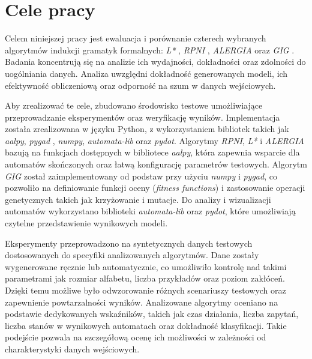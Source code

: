 
\section{Cele pracy}
\label{sec:celePracy}


Celem niniejszej pracy jest ewaluacja i porównanie czterech wybranych algorytmów indukcji gramatyk formalnych: \textit{L*} \cite{L_STAR}, \textit{RPNI} \cite{RPNI}, \textit{ALERGIA} \cite{ALERGIA} oraz \textit{GIG} \cite{GIG}. Badania koncentrują się na analizie ich wydajności, dokładności oraz zdolności do uogólniania danych. Analiza uwzględni dokładność generowanych modeli, ich efektywność obliczeniową oraz odporność na szum w danych wejściowych.

Aby zrealizować te cele, zbudowano środowisko testowe umożliwiające przeprowadzanie eksperymentów oraz weryfikację wyników. Implementacja została zrealizowana w języku Python, z wykorzystaniem bibliotek takich jak \textit{aalpy}, \textit{pygad} \cite{Gad2024}, \textit{numpy}, \textit{automata-lib} oraz \textit{pydot}. Algorytmy \textit{RPNI}, \textit{L*} i \textit{ALERGIA} bazują na funkcjach dostępnych w bibliotece \textit{aalpy}, która zapewnia wsparcie dla automatów skończonych oraz łatwą konfigurację parametrów testowych. Algorytm \textit{GIG} został zaimplementowany od podstaw przy użyciu \textit{numpy} i \textit{pygad}, co pozwoliło na definiowanie funkcji oceny (\textit{fitness functions}) i zastosowanie operacji genetycznych takich jak krzyżowanie i mutacje. Do analizy i wizualizacji automatów wykorzystano biblioteki \textit{automata-lib} oraz \textit{pydot}, które umożliwiają czytelne przedstawienie wynikowych modeli.

Eksperymenty przeprowadzono na syntetycznych danych testowych dostosowanych do specyfiki analizowanych algorytmów. Dane zostały wygenerowane ręcznie lub automatycznie, co umożliwiło kontrolę nad takimi parametrami jak rozmiar alfabetu, liczba przykładów oraz poziom zakłóceń. Dzięki temu możliwe było odwzorowanie różnych scenariuszy testowych oraz zapewnienie powtarzalności wyników. Analizowane algorytmy oceniano na podstawie dedykowanych wskaźników, takich jak czas działania, liczba zapytań, liczba stanów w wynikowych automatach oraz dokładność klasyfikacji. Takie podejście pozwala na szczegółową ocenę ich możliwości w zależności od charakterystyki danych wejściowych.

